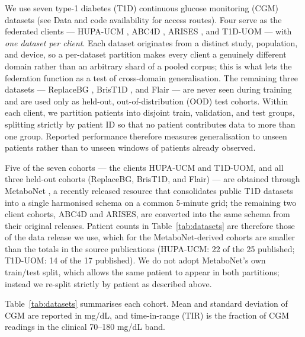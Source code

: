 \documentclass[10pt,letterpaper]{article}
\begin{document}
We use seven type-1 diabetes (T1D) continuous glucose
monitoring (CGM) datasets (see Data and code availability for access routes). Four serve as the federated clients --- HUPA-UCM
\cite{hidalgo2024hupaucm}, ABC4D \cite{abc4d_nct}, ARISES \cite{zhu2022arises},
and T1D-UOM \cite{alsuhaymi2025t1duom} --- with \emph{one dataset per client}. Each dataset
originates from a distinct study, population, and device, so a per-dataset
partition makes every client a genuinely different domain rather than an
arbitrary shard of a pooled corpus; this is what lets the federation function as
a test of cross-domain generalisation. The remaining three datasets ---
ReplaceBG \cite{aleppo2017replacebg}, BrisT1D \cite{james2025brist1d}, and Flair
\cite{jaeb_flair} --- are never seen
during training and are used only as held-out, out-of-distribution (OOD) test
cohorts. Within
each client, we partition patients
into disjoint train, validation, and test groups, splitting strictly by
patient ID so that no patient contributes data to more than one group. Reported performance therefore measures generalisation to
unseen patients rather than to unseen windows of patients already observed.

Five of the seven cohorts --- the clients HUPA-UCM and T1D-UOM, and all three
held-out cohorts (ReplaceBG, BrisT1D, and Flair) --- are obtained through
MetaboNet \cite{wolff2026metabonet}, a
recently released resource that consolidates public T1D datasets into a single
harmonised schema on a common 5-minute grid; the remaining two client cohorts,
ABC4D and ARISES, are converted
into the same schema from their original releases. Patient counts in
Table~\ref{tab:datasets} are therefore those of the data release we use, which
for the MetaboNet-derived cohorts are smaller than the totals in the source
publications (HUPA-UCM: 22 of the 25 published; T1D-UOM: 14 of the 17
published). We do not adopt MetaboNet's own train/test split, which allows the
same patient to appear in both partitions; instead we re-split strictly by
patient as described above.

Table~\ref{tab:datasets} summarises each cohort. Mean and standard deviation of
CGM are reported in mg/dL, and time-in-range (TIR) is the fraction of CGM
readings in the clinical 70--180 mg/dL band.
\end{document}
